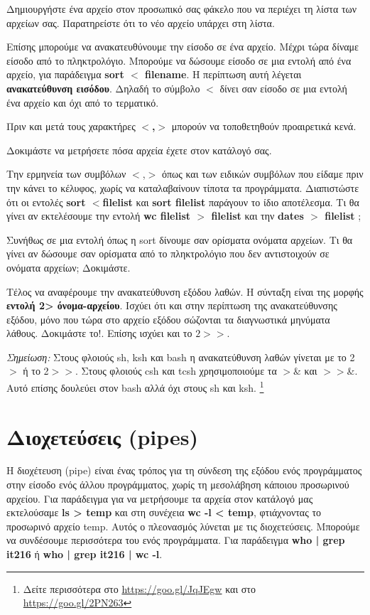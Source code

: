 Δημιουργήστε ένα αρχείο στον προσωπικό σας φάκελο που να περιέχει τη λίστα των αρχείων σας. Παρατηρείστε ότι το νέο αρχείο υπάρχει στη λίστα. 

Επίσης μπορούμε να ανακατευθύνουμε την είσοδο σε ένα αρχείο. Μέχρι τώρα δίναμε είσοδο από το πληκτρολόγιο. Μπορούμε να δώσουμε είσοδο σε μια εντολή από ένα αρχείο, για παράδειγμα \textbf{sort $<$ filename}. Η περίπτωση αυτή λέγεται \textbf{ανακατεύθυνση εισόδου}.  Δηλαδή το σύμβολο
\textbf{$<$} δίνει σαν είσοδο σε μια εντολή ένα αρχείο και όχι από το τερματικό. 

Πριν και μετά τους χαρακτήρες \textbf{$<$,$>$} μπορούν να τοποθετηθούν προαιρετικά κενά. 

Δοκιμάστε να μετρήσετε πόσα αρχεία έχετε στον κατάλογό σας.

Την ερμηνεία των συμβόλων $<$,$>$ όπως και των ειδικών συμβόλων που είδαμε πριν την κάνει το κέλυφος, χωρίς να καταλαβαίνουν τίποτα τα προγράμματα. Διαπιστώστε ότι οι εντολές \textbf{sort $<$filelist} και \textbf{sort filelist} παράγουν το ίδιο αποτέλεσμα. Τι θα γίνει αν
εκτελέσουμε την εντολή \textbf{wc filelist $>$ filelist} και την \textbf{dates $>$ filelist} ;

Συνήθως σε μια εντολή όπως η sort δίνουμε σαν ορίσματα ονόματα αρχείων. Τι θα γίνει αν δώσουμε σαν ορίσματα από το πληκτρολόγιο που δεν
αντιστοιχούν σε ονόματα αρχείων; Δοκιμάστε.

Τέλος να αναφέρουμε την ανακατεύθυνση εξόδου λαθών. Η σύνταξη είναι της μορφής \textbf{εντολή 2> όνομα-αρχείου}.    Ισχύει ότι και στην
περίπτωση της ανακατεύθυνσης εξόδου, μόνο που τώρα στο αρχείο εξόδου σώζονται τα
διαγνωστικά μηνύματα λάθους. Δοκιμάστε το!. Επίσης ισχύει και το $2>>$.

\emph{Σημείωση:} Στους φλοιούς sh, ksh και bash η ανακατεύθυνση λαθών γίνεται με το 2$>$ ή το 2$>>$. Στους φλοιούς csh και tcsh χρησιμοποιούμε
τα $>$\& και $>>$\&. Αυτό επίσης δουλεύει στον bash αλλά όχι στους sh και ksh. \footnote{Δείτε περισσότερα στο \href{https://goo.gl/JqJEgw}{https://goo.gl/JqJEgw} και στο \href{https://goo.gl/2PN263}{https://goo.gl/2PN263}}



\section{Διοχετεύσεις (pipes)}

Η διοχέτευση (pipe) είναι ένας τρόπος για τη σύνδεση της εξόδου ενός προγράμματος στην είσοδο ενός άλλου προγράμματος, χωρίς τη μεσολάβηση
κάποιου προσωρινού αρχείου. Για παράδειγμα για να μετρήσουμε τα αρχεία στον κατάλογό μας εκτελούσαμε \textbf{ls > temp} και  στη συνέχεια
\textbf{wc -l < temp}, φτιάχνοντας το προσωρινό αρχείο temp. Αυτός ο πλεονασμός λύνεται με τις διοχετεύσεις. Μπορούμε να συνδέσουμε
περισσότερα του ενός προγράμματα. Για παράδειγμα \textbf{who | grep it216} ή \textbf{who | grep it216 | wc -l}.

